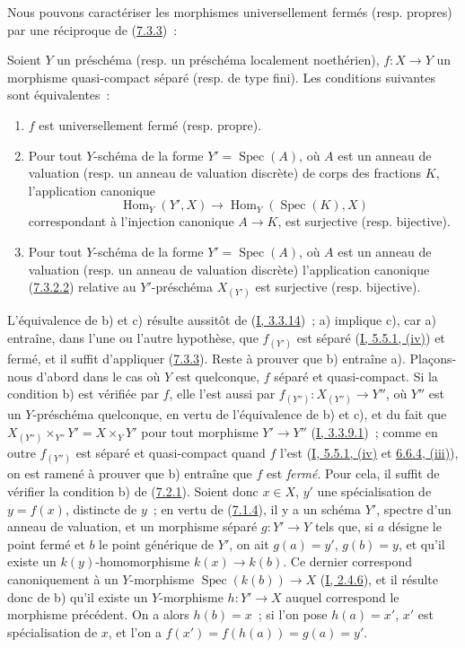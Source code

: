 Nous pouvons caractériser les morphismes universellement fermés (resp.
propres) par une réciproque de (\hyperref[II.7.3.3-fr]{7.3.3})~:

\begin{theorem}[7.3.8]
\label{II.7.3.8-fr}
Soient $Y$ un préschéma (resp. un préschéma localement noethérien), $f:X\to Y$
un morphisme quasi-compact séparé (resp. de type fini). Les conditions
suivantes sont équivalentes~:
\begin{enumerate}
\item[\rm a)] $f$ est universellement fermé (resp. propre).
\item[\rm b)] Pour tout $Y$-schéma de la forme
$Y'=\operatorname{Spec}(A)$, où $A$ est un anneau de valuation (resp. un anneau
de valuation discrète) de corps des fractions $K$, l'application canonique
\[
\operatorname{Hom}_Y(Y',X)\longrightarrow
\operatorname{Hom}_Y(\operatorname{Spec}(K),X)
\]
correspondant à l'injection canonique $A\to K$, est surjective (resp.
bijective).
\item[\rm c)] Pour tout $Y$-schéma de la forme $Y'=\operatorname{Spec}(A)$,
où $A$ est un anneau de valuation (resp. un anneau de valuation discrète)
l'application canonique (\hyperref[II.7.3.2.2-fr]{7.3.2.2}) relative au
$Y'$-préschéma $X_{(Y')}$ est surjective (resp. bijective).
\end{enumerate}
\end{theorem}

L'équivalence de b) et c) résulte aussitôt de
(\hyperref[I.3.3.14-fr]{I, 3.3.14})~; a) implique c), car a) entraîne, dans
l'une ou l'autre hypothèse, que $f_{(Y')}$ est séparé
(\hyperref[I.5.5.1-fr]{I, 5.5.1, (iv)}) et fermé, et il suffit d'appliquer
(\hyperref[II.7.3.3-fr]{7.3.3}). Reste à prouver que b) entraîne a).
Plaçons-nous d'abord dans le cas où $Y$ est quelconque, $f$ séparé et
quasi-compact. Si la condition b) est vérifiée par $f$, elle l'est aussi par
$f_{(Y'')}:X_{(Y'')}\to Y''$, où $Y''$ est un $Y$-préschéma quelconque, en
vertu de l'équivalence de b) et c), et du fait que
$X_{(Y'')}\times_{Y''}Y'=X\times_YY'$ pour tout morphisme $Y'\to Y''$
(\hyperref[I.3.3.9.1-fr]{I, 3.3.9.1})~; comme en outre $f_{(Y'')}$ est séparé
et quasi-compact quand $f$ l'est
(\hyperref[I.5.5.1-fr]{I, 5.5.1, (iv)} et
\hyperref[I.6.6.4-fr]{6.6.4, (iii)}), on est ramené à prouver que b) entraîne
que $f$ est \emph{fermé}. Pour cela, il suffit de vérifier la condition b) de
(\hyperref[II.7.2.1-fr]{7.2.1}). Soient donc $x\in X$, $y'$ une spécialisation
de $y=f(x)$, distincte de $y$~; en vertu de
(\hyperref[II.7.1.4-fr]{7.1.4}), il y a un schéma $Y'$, spectre d'un anneau de
valuation, et un morphisme séparé $g:Y'\to Y$ tels que, si $a$ désigne le point
fermé et $b$ le point générique de $Y'$, on ait $g(a)=y'$, $g(b)=y$, et qu'il
existe un $k(y)$-homomorphisme $k(x)\to k(b)$. Ce dernier correspond
canoniquement à un $Y$-morphisme $\operatorname{Spec}(k(b))\to X$
(\hyperref[I.2.4.6-fr]{I, 2.4.6}), et il résulte donc de b) qu'il existe un
$Y$-morphisme $h:Y'\to X$ auquel correspond le morphisme précédent. On a
alors $h(b)=x$~; si l'on pose $h(a)=x'$, $x'$ est spécialisation de $x$, et
l'on a $f(x')=f(h(a))=g(a)=y'$.

